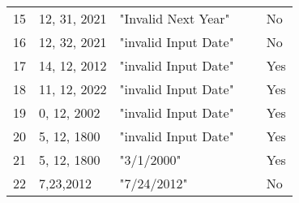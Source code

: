 \begin{table}[htb]
\begin{tabular}{|l|l|l|l|l|}
        15                   & 12, 31, 2021 & "Invalid Next Year"    & ~                & No   \\ 
        16                   & 12, 32, 2021 & "invalid Input Date"   & ~                & No   \\ 
        17                   & 14, 12, 2012 & "invalid Input Date"   & ~                & Yes  \\ 
        18                   & 11, 12, 2022 & "invalid Input Date"   & ~                & Yes  \\ 
        19                   & 0, 12, 2002  & "invalid Input Date"   & ~                & Yes  \\ 
        20                   & 5, 12, 1800  & "invalid Input Date"   & ~                & Yes  \\ 
        21                   & 5, 12, 1800  & "3/1/2000"             & ~                & Yes  \\ 
        22                   & 7,23,2012    & "7/24/2012"            & ~                & No   \\
        \hline
    \end{tabular}
\end{table}






